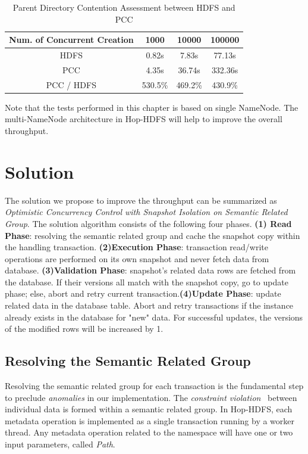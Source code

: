 \documentclass[runningheads,a4paper]{llncs}
\begin{document}
\begin{table}[h]
	\centering
	\begin{tabular}{|c|c|c|c|}
		\hline
		\textbf{Num. of Concurrent Creation} & \textbf{1000} & \textbf{10000} & \textbf{100000} \\ \hline
		HDFS                                 & 0.82s         & 7.83s          & 77.13s          \\ \hline
		PCC                       & 4.35s         & 36.74s         & 332.36s         \\ \hline
		PCC / HDFS                           & 530.5\%       & 469.2\%        & 430.9\%         \\ \hline
	\end{tabular}
	\caption{Parent Directory Contention Assessment between HDFS and PCC}
	\label{table:hdfsPCCparentA}
\end{table}

Note that the tests performed in this chapter is based on single NameNode. The multi-NameNode architecture in Hop-HDFS will help to improve the overall throughput.


\section{Solution}
The solution we propose to improve the throughput can be summarized as \textit{Optimistic Concurrency Control with Snapshot Isolation on Semantic Related Group}. The solution algorithm consists of the following four phases. \textbf{(1) Read Phase}: resolving the semantic related group and cache the snapshot copy within the handling transaction. \textbf{(2)Execution Phase}: transaction read/write operations are performed on its own snapshot and never fetch data from database. \textbf{(3)Validation Phase}: snapshot's related data rows are fetched from the database. If their versions all match with the snapshot copy, go to update phase; else, abort and retry current transaction.\textbf{(4)Update Phase}: update related data in the database table. Abort and retry transactions if the instance already exists in the database for "new" data. For successful updates, the versions of the modified rows will be increased by 1.

\subsection{Resolving the Semantic Related Group}
Resolving the semantic related group for each transaction is the fundamental step to preclude \textit{anomalies} in our implementation. The \textit{constraint violation}~\cite{berenson1995critique} between individual data is formed within a semantic related group. In Hop-HDFS, each metadata operation is implemented as a single transaction running by a worker thread. Any metadata operation related to the namespace will have one or two input parameters, called \textit{Path}.
\end{document}
